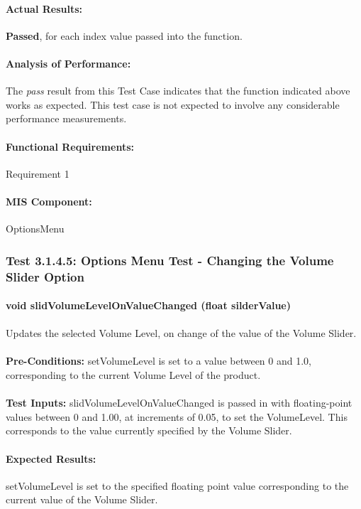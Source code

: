 \documentclass{article}
\begin{document}
    \paragraph{Actual Results:} \textbf{Passed}, for each index value passed into the function.
    \paragraph{Analysis of Performance:} The \emph{pass} result from this Test Case indicates that the function indicated above works as expected. This test case is not expected to involve any considerable performance measurements.
    \paragraph{Functional Requirements:} Requirement 1
    \paragraph{MIS Component:} OptionsMenu
    
    \subsubsection{Test 3.1.4.5: Options Menu Test - Changing the Volume Slider Option}
    \paragraph{}\textbf{void slidVolumeLevelOnValueChanged (float silderValue)}
    \paragraph{} Updates the selected Volume Level, on change of the value of the Volume Slider.
    \paragraph{}\textbf{Pre-Conditions:} setVolumeLevel is set to a value between 0 and 1.0, corresponding to the current Volume Level of the product.
    \paragraph{}\textbf{Test Inputs:} slidVolumeLevelOnValueChanged is passed in with floating-point values between 0 and 1.00, at increments of 0.05, to set the VolumeLevel. This corresponds to the value currently specified by the Volume Slider.
    \paragraph{Expected Results:} setVolumeLevel is set to the specified floating point value corresponding to the current value of the Volume Slider.
\end{document}
